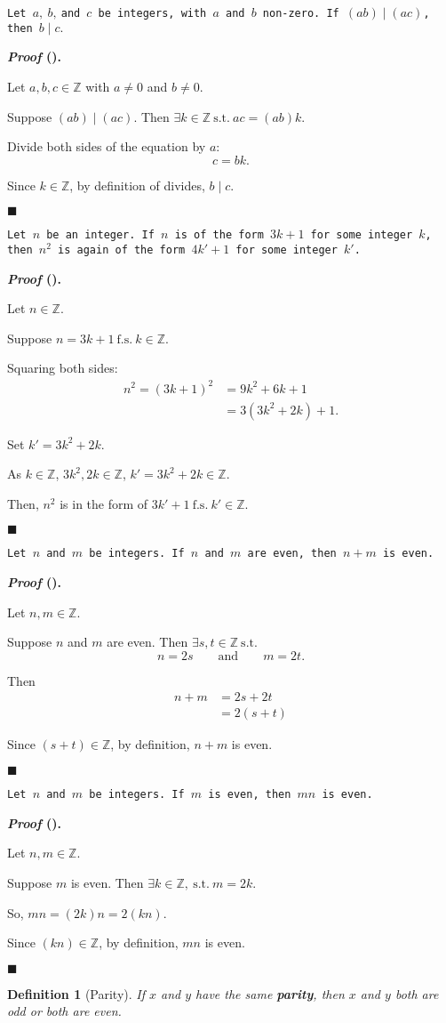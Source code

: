 \documentclass[12pt,a4paper]{article}
\newcounter{nprf}[subsection]
\newtheorem{df}{Definition}[subsection]
\newenvironment*{prf}{\par\indent\textbf{\textit{Proof} (\stepcounter{nprf}\thenprf). }\par}{\par\hfill $\blacksquare$\par}
\def\Z{{\mathbb{Z}}}
\def\st{\ \mathrm{s.t.}\ }
\def\fs{\ \mathrm{f.s.}\ }
\begin{document}
\begin{framed}
\noindent\texttt{Let $a,\ b,\ $and $c$ be integers, with $a$ and $b$ non-zero. If $(ab)\mid(ac)$, then $b\mid c.$}
\begin{prf}
	Let	$a,b,c\in\Z$ with $a\neq0$ and $b\neq0$.\par Suppose $(ab)\mid(ac)$. Then $\exists k\in\Z\st ac=(ab)k$.\par Divide both sides of the equation by $a$: \[c=bk.\]\par Since $k\in\Z$, by definition of divides, $b\mid c$.
\end{prf}
\end{framed}
\begin{framed}
\noindent\texttt{Let $n$ be an integer. If $n$ is of the form $3k+1$ for some integer $k$, then $n^2$ is again of the form $4k'+1$ for some integer $k'$.}
\begin{prf}
	Let $n\in\Z$.\par Suppose $n=3k+1\fs k\in\Z$.\par Squaring both sides: \[\begin{aligned}n^2=(3k+1)^2&=9k^2+6k+1\\&=3(3k^2+2k)+1.\end{aligned}\]\par Set $k'=3k^2+2k.$\par As $k\in\Z$, $3k^2, 2k\in\Z$, $k'=3k^2+2k\in\Z$.\par Then, $n^2$ is in the form of $3k'+1\fs k'\in\Z.$
\end{prf}
\end{framed}
\begin{framed}
\noindent\texttt{Let $n$ and $m$ be integers. If $n$ and $m$ are even, then $n+m$ is even.}
\begin{prf}
	Let $n,m\in\Z$.\par Suppose $n$ and $m$ are even. Then $\exists s,t\in\Z\st$ \[n=2s\qquad\text{and}\qquad m=2t.\]\par Then\[\begin{aligned}n+m&=2s+2t\\&=2(s+t)\end{aligned}\]\par Since $(s+t)\in\Z$, by definition, $n+m$ is even.
\end{prf}
\end{framed}
\begin{framed}
\noindent\texttt{Let $n$ and $m$ be integers. If $m$ is even, then $mn$ is even.}
\begin{prf}
	Let $n,m\in\Z.$\par Suppose $m$ is even. Then $\exists k\in\Z,\st m=2k.$\par So, $mn=(2k)n=2(kn).$\par Since $(kn)\in\Z$, by definition, $mn$ is even.	
\end{prf}
\end{framed}
\begin{df}[Parity]
	If $x$ and $y$ have the same \textbf{parity}, then $x$ and $y$ both are odd or both are even. 	
\end{df}
\end{document}
